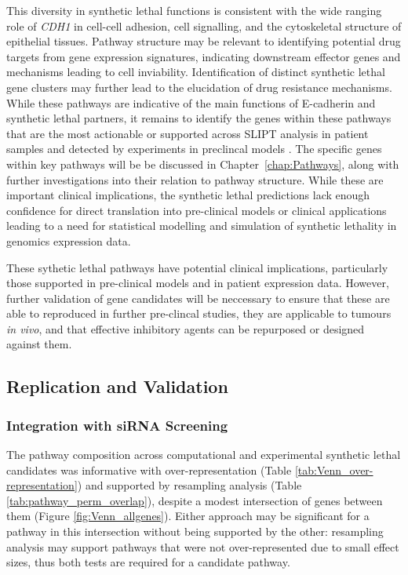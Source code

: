 This diversity in synthetic lethal functions is consistent with the wide ranging role of \textit{CDH1} in cell-cell adhesion, cell signalling, and the cytoskeletal structure of epithelial tissues. Pathway structure may be relevant to identifying potential drug targets from gene expression signatures, indicating downstream effector genes and mechanisms leading to cell inviability. Identification of distinct synthetic lethal gene clusters may further lead to the elucidation of drug resistance mechanisms. While these pathways are indicative of the main functions of E-cadherin and synthetic lethal partners, it remains to identify the genes within these pathways that are the most actionable or supported across SLIPT analysis in patient samples and detected by experiments in preclincal models \citep{Chen2014, Telford2015}.  The specific genes within key pathways will be be discussed in Chapter~\ref{chap:Pathways}, along with further investigations into their relation to pathway structure.  While these are important clinical implications, the synthetic lethal predictions lack enough confidence for direct translation into pre-clinical models or clinical applications leading to a need for statistical modelling and simulation of synthetic lethality in genomics expression data.

These sythetic lethal pathways have potential clinical implications, particularly those supported in pre-clinical models and in patient expression data. However, further validation of gene candidates will be neccessary to ensure that these are able to reproduced in further pre-clincal studies, they are applicable to tumours \textit{in vivo}, and that effective inhibitory agents can be repurposed or designed against them.

\subsection{Replication and Validation}

\subsubsection{Integration with siRNA Screening}

The pathway composition across computational and experimental synthetic lethal candidates was informative with over-represent\-ation (Table \ref{tab:Venn_over-representation}) and supported by resampling analysis (Table \ref{tab:pathway_perm_overlap}), despite a modest intersection of genes between them (Figure \ref{fig:Venn_allgenes}). Either approach may be significant for a pathway in this intersection without being supported by the other: resampling analysis may support pathways that were not over-represent\-ed due to small effect sizes, thus both tests are required for a candidate pathway.


